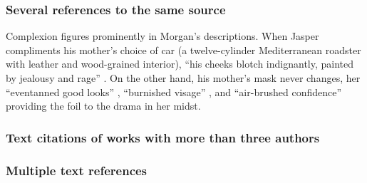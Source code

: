 \documentclass[11pt,letterpaper,oneside]{article}
\begin{document}
\setcounter{subsubsection}{26}
\subsubsection{Several references to the same source}

\begin{citeref}%
\item Complexion figures prominently in Morgan's descriptions. When
Jasper compliments his mother's choice of car (a twelve-cylinder
Mediterranean roadster with leather and wood-grained interior), ``his
cheeks blotch indignantly, painted by jealousy and rage''
\parencite[47]{chaston2000}. On the other hand, his mother's mask
never changes, her ``even\-tanned good looks''
\parencite[56]{chaston2000}, ``burnished visage''
\parencite[101]{chaston2000}, and ``air-brushed confidence''
\parencite[211]{chaston2000} providing the foil to the drama in her
midst. \end{citeref}

\setcounter{subsubsection}{28}
\subsubsection{Text citations of works with more than three authors}

\begin{citeref}
\item \parencite{schonen2017a}
\item \parencite{schonen2017b}
\end{citeref}

\subsubsection{Multiple text references}

\begin{citeref}
\item \parencite{armstrong1989,beigl1989,pickett1985}
\item \parencites{whittaker1967,whittaker1975,wiens1989a,wiens1989b}
\item \parencites[328]{wong1999}[475]{wong2000}[67]{garcia1998}
\item \parencites{guest2006}[see also][]{stalle2008}{rahn2009}
\end{citeref}
\end{document}
